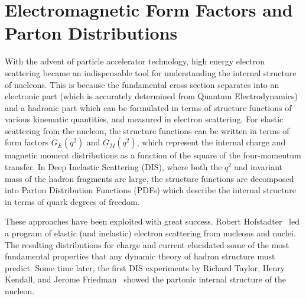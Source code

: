 \section{Electromagnetic Form Factors and Parton Distributions}\label{sec:section2-FF-PDF}

With the advent of particle accelerator technology, high energy electron scattering became an indispensable tool for understanding the internal structure of nucleons. This is because the fundamental cross section separates into an electronic part (which is accurately determined from Quantum Electrodynamics) and a hadronic part which can be formulated in terms of structure functions of various kinematic quantities, and measured in electron scattering. For elastic scattering from the nucleon, the structure functions can be written in terms of form factors $G_E(q^2)$ and $G_M(q^2)$, which represent the internal charge and magnetic moment distributions as a function of the square of the four-momentum transfer. In Deep Inelastic Scattering (DIS), where both the $q^2$  and invariant mass of the hadron fragments are large, the structure functions are decomposed into Parton Distribution Functions (PDFs) which describe the internal structure in terms of quark degrees of freedom.

These approaches have been exploited with great success. Robert Hofstadter~\cite{RevModPhys.28.214} led a program of elastic (and inelastic) electron scattering from nucleons and nuclei. The resulting distributions for charge and current elucidated some of the most fundamental properties that any dynamic theory of hadron structure must predict. Some time later, the first DIS experiments by Richard Taylor, Henry Kendall, and Jerome Friedman~\cite{RevModPhys.63.573,RevModPhys.63.597,RevModPhys.63.615} showed the partonic internal structure of the nucleon. 

